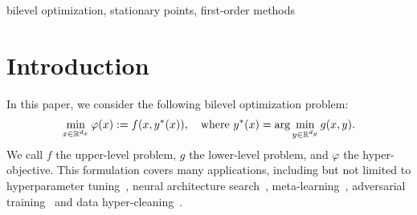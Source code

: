 \documentclass[twoside,11pt]{article}
\begin{document}
\begin{keywords}
  bilevel optimization, stationary points, first-order methods
\end{keywords}

\section{Introduction}

In this paper, we consider the following bilevel optimization problem:
\begin{align} \label{hyper-refo}
    \min_{x \in {\mathbb{R}}^{d_x}} \varphi(x) := f(x,y^*(x)) , \quad {\rm where}~ y^*(x) = \arg \min_{y \in {\mathbb{R}}^{d_y}} g(x,y).
\end{align}
We call $f$ the upper-level problem, $g$ the lower-level problem, and $\varphi$ the hyper-objective.
This formulation covers many applications, including but not limited to hyperparameter tuning~\citep{franceschi2018bilevel,pedregosa2016hyperparameter,bae2020delta,mackay2018self}, neural architecture search~\citep{liu2018darts,wang2022zarts,zoph2016neural,zhang2021idarts}, meta-learning~\citep{finn2017model,fallah2020convergence,andrychowicz2016learning,mishchenko2023convergence,rajeswaran2019meta,chandra2022gradient,ji2022theoretical,zhou2019efficient}, adversarial training~\citep{zhang2022revisiting,bruckner2011stackelberg,wang2021fast,bishop2020optimal,wang2022solving,robey2023adversarial} and data hyper-cleaning~\citep{gao2022self,zhou2022model,ren2018learning,yong2022holistic,shu2019meta,li2022ood}.
\end{document}
